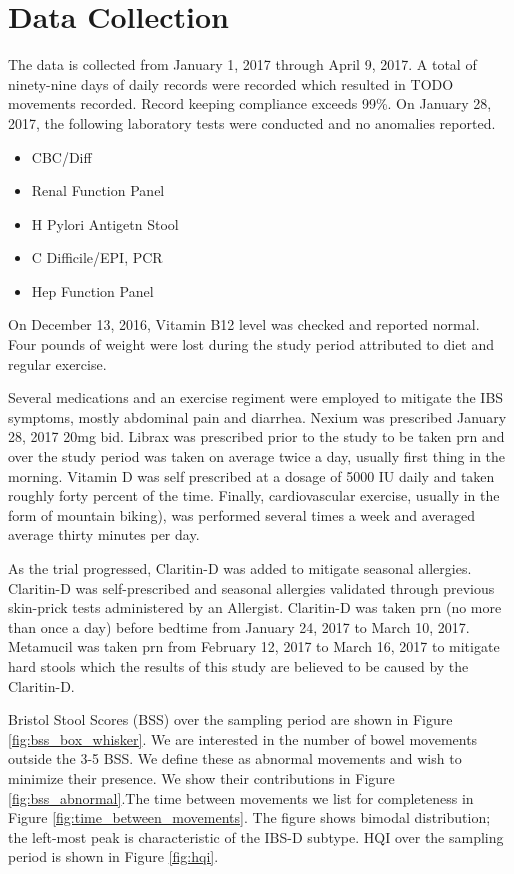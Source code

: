 \documentclass[conference]{IEEEtran}
\begin{document}
\section{Data Collection}

The data is collected from January 1, 2017 through April 9, 2017. A total of ninety-nine days of daily records were recorded which resulted in TODO movements recorded.  Record keeping compliance exceeds 99\%. On January 28, 2017, the following laboratory tests were conducted and no anomalies reported.
\begin{itemize}
\item CBC/Diff
\item Renal Function Panel
\item H Pylori Antigetn Stool
\item C Difficile/EPI, PCR
\item Hep Function Panel
\end{itemize}
On December 13, 2016, Vitamin B12 level was checked and reported normal. Four pounds of weight were lost during the study period attributed to diet and regular exercise.

Several medications and an exercise regiment were employed to mitigate the IBS symptoms, mostly abdominal pain and diarrhea. Nexium was prescribed January 28, 2017 20mg bid.  Librax was prescribed prior to the study to be taken prn and over the study period was taken on average twice a day, usually first thing in the morning. Vitamin D was self prescribed at a dosage of 5000 IU daily and taken roughly forty percent of the time. Finally, cardiovascular exercise, usually in the form of mountain biking), was performed several times a week and averaged average thirty minutes per day.

As the trial progressed, Claritin-D was added to mitigate seasonal allergies. Claritin-D was self-prescribed and seasonal allergies validated through previous skin-prick tests administered by an Allergist. Claritin-D was taken prn (no more than once a day) before bedtime from January 24, 2017 to March 10, 2017. Metamucil was taken prn from February 12, 2017 to March 16, 2017 to mitigate hard stools which the results of this study are believed to be caused by the Claritin-D.

Bristol Stool Scores (BSS) over the sampling period are shown in Figure \ref{fig:bss_box_whisker}. We are interested in the number of bowel movements outside the 3-5 BSS. We define these as abnormal movements and wish to minimize their presence.  We show their contributions in Figure \ref{fig:bss_abnormal}.The time between movements we list for completeness in Figure \ref{fig:time_between_movements}.  The figure shows bimodal distribution; the left-most peak is characteristic of the IBS-D subtype. HQI over the sampling period is shown in Figure \ref{fig:hqi}.
\end{document}
